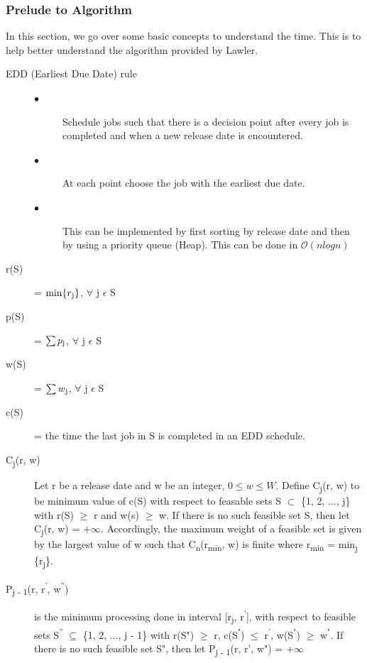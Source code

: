 \documentclass[11pt]{article}
\begin{document}
{				\subsubsection{Prelude to Algorithm}
				In this section, we go over some basic concepts to understand the time. This is to help better understand the algorithm provided by Lawler.
				\begin{description}
					\item[EDD (Earliest Due Date) rule]
					\begin{description} 
						\item[$\bullet$] Schedule jobs such that there is a decision point after every job is completed and when a new release date is encountered.
						\item[$\bullet$] At each point choose the job with the earliest due date. 
						\item[$\bullet$] This can be implemented by first sorting by release date and then by using a priority queue (Heap). This can be done in $\mathcal{O}({nlogn})$
					\end{description}
					\item[r(S)] = $\min \{r\textsubscript{j}\}$, $\forall$ j $\epsilon$ S
					\item[p(S)] = $\sum {p\textsubscript{j}}$, $\forall$ j $\epsilon$ S
					\item[w(S)] = $\sum {w\textsubscript{j}}$, $\forall$ j $\epsilon$ S
					\item[c(S)] = the time the last job in S is completed in an EDD schedule. 
					\item[C\textsubscript{j}(r, w)] Let r be a release date and w be an integer, $0 \leq w \leq W$. Define C\textsubscript{j}(r, w) to be minimum value of c(S) with respect to feasable sets S $\subset$ \{1, 2, ..., j\} with r(S) $\ge$ r and w(s) $\ge$ w. If there is no such feasible set S, then let C\textsubscript{j}(r, w) = $+\infty$. Accordingly, the maximum weight of a feasible set is given by the largest value of w such that C\textsubscript{n}(r\textsubscript{min}, w) is finite where r\textsubscript{min} = min\textsubscript{j} \{r\textsubscript{j}\}.
					\item[P\textsubscript{j - 1}(r, r\textsuperscript{'}, w\textsuperscript{''})] is the minimum processing done in interval [r\textsubscript{j}, r\textsuperscript{'}], with respect to feasible sets S\textsuperscript{''} $\subseteq$ \{1, 2, ..., j - 1\} with r(S") $\geq$ r, c(S\textsuperscript{"}) $\leq$ r\textsuperscript{'}, w(S\textsuperscript{"}) $\geq$ w\textsuperscript{"}. If there is no such feasible set S", then let P\textsubscript{j - 1}(r, r', w") = +$\infty$
				\end{description}
				
}
\end{document}
